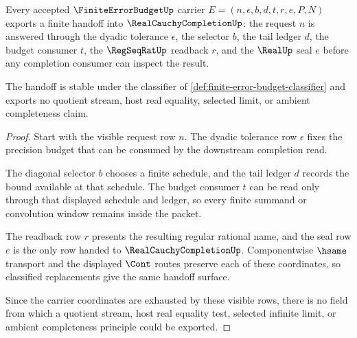\begin{theorem}
\label{thm:finite-error-budget-diagonal-handoff}
Every accepted $\FiniteErrorBudgetUp$ carrier
$E=(n,\epsilon,b,d,t,r,e,P,N)$ exports a finite handoff into
$\RealCauchyCompletionUp$: the request $n$ is answered through the dyadic
tolerance $\epsilon$, the selector $b$, the tail ledger $d$, the budget
consumer $t$, the $\RegSeqRatUp$ readback $r$, and the $\RealUp$ seal $e$ before
any completion consumer can inspect the result.

The handoff is stable under the classifier of
\autoref{def:finite-error-budget-classifier} and exports no quotient stream,
host real equality, selected limit, or ambient completeness claim.
\end{theorem}
\begin{proof}
Start with the visible request row $n$. The dyadic tolerance row $\epsilon$
fixes the precision budget that can be consumed by the downstream completion
read.

The diagonal selector $b$ chooses a finite schedule, and the tail ledger $d$
records the bound available at that schedule. The budget consumer $t$ can be
read only through that displayed schedule and ledger, so every finite summand
or convolution window remains inside the packet.

The readback row $r$ presents the resulting regular rational name, and the seal
row $e$ is the only row handed to $\RealCauchyCompletionUp$. Componentwise
$\hsame$ transport and the displayed $\Cont$ routes preserve each of these
coordinates, so classified replacements give the same handoff surface.

Since the carrier coordinates are exhausted by these visible rows, there is no
field from which a quotient stream, host real equality test, selected infinite
limit, or ambient completeness principle could be exported.
\end{proof}

